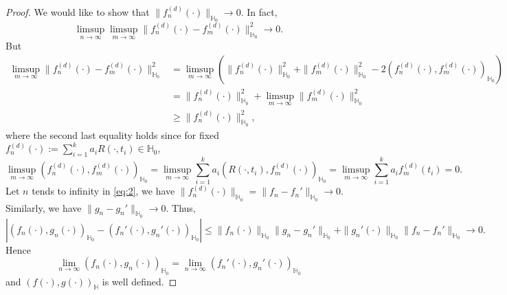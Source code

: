 \documentclass[11pt]{article}
\theoremstyle{plain}
\theoremstyle{definition}
\theoremstyle{remark}
\begin{document}
\begin{proof}
We would like to show that $\|f^{(d)}_n(\cdot)\|_{\mathbb H_0} \to 0$.
In fact,
\begin{equation*}
    \limsup_{n\to \infty}
    \limsup_{m\to \infty}
\|f^{(d)}_n(\cdot)-f^{(d)}_m(\cdot)\|_{\mathbb H_0}^2\to 0.
\end{equation*}
But
\begin{equation}\label{eq:2}
    \begin{split}
    \limsup_{m\to \infty}
    \|f^{(d)}_n(\cdot)-f^{(d)}_m(\cdot)\|_{\mathbb H_0}^2
    &=
    \limsup_{m\to \infty}
    \left(\|f^{(d)}_n(\cdot)\|_{\mathbb H_0}^2
    +
    \|f^{(d)}_m(\cdot)\|_{\mathbb H_0}^2
    -
    2(f^{(d)}_n(\cdot), f^{(d)}_m(\cdot))_{\mathbb H_0}
\right)
\\
&= 
    \|f^{(d)}_n(\cdot)\|_{\mathbb H_0}^2
    +
    \limsup_{m\to \infty}
    \|f^{(d)}_m(\cdot)\|_{\mathbb H_0}^2
    \\
    &\geq
    \|f^{(d)}_n(\cdot)\|_{\mathbb H_0}^2
    ,
    \end{split}
\end{equation}
where the second last equality holds since
for fixed $f^{(d)}_n(\cdot):=\sum_{i=1}^k a_i R(\cdot, t_i)\in \mathbb H_0$,
\begin{equation*}
    \limsup_{m\to \infty}
    (f^{(d)}_n(\cdot), f^{(d)}_m(\cdot))_{\mathbb H_0}
    =
    \limsup_{m\to \infty}
    \sum_{i=1}^k a_i (R(\cdot, t_i), f^{(d)}_m(\cdot))_{\mathbb H_0}
    =
    \limsup_{m\to \infty}
    \sum_{i=1}^k a_i f^{(d)}_m(t_i)
    =
    0.
\end{equation*}
Let $n$ tends to infinity in \eqref{eq:2}, we have $\|f^{(d)}_n(\cdot)\|_{\mathbb H_0}=\|f_n-f_n'\|_{\mathbb H_0} \to 0$.
Similarly, we have
$\|g_n-g_n'\|_{\mathbb H_0} \to 0$.
Thus,
\begin{equation*}
    | (f_n(\cdot), g_n(\cdot))_{\mathbb H_0}
    -
     (f_n'(\cdot), g_n'(\cdot))_{\mathbb H_0}|
     \leq \|f_n(\cdot)\|_{\mathbb H_0} \|g_n-g_n'\|_{\mathbb H_0}
     +
     \|g_n'(\cdot)\|_{\mathbb H_0} \|f_n-f_n'\|_{\mathbb H_0}\to 0.
\end{equation*}
Hence 
\begin{equation*}
    \lim_{n\to \infty} (f_n(\cdot), g_n(\cdot))_{\mathbb H_0}
    =\lim_{n\to \infty}
     (f_n'(\cdot), g_n'(\cdot))_{\mathbb H_0}
\end{equation*}
and $(f(\cdot),g(\cdot))_{\mathbb H}$ is well defined.


\end{proof}
\end{document}
